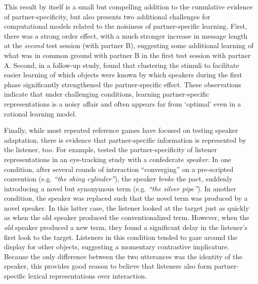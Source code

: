 \documentclass[11pt, floatsintext, jou]{apa6}
\begin{document}
This result by itself is a small but compelling addition to the cumulative evidence of partner-specificity, but also presents two additional challenges for computational models related to the noisiness of partner-specific learning. First, there was a strong order effect, with a much stronger increase in message length at the \emph{second} test session (with partner B), suggesting some additional learning of what was in common ground with partner B in the first test session with partner A. Second, in a follow-up study,  found that clustering the stimuli to facilitate easier learning of which objects were known by which speakers during the first phase significantly strengthened the partner-specific effect. These observations indicate that under challenging conditions, learning partner-specific representations is a noisy affair and often appears far from `optimal' even in a rational learning model. 


Finally, while most repeated reference games have focused on testing speaker adaptation, there is evidence that partner-specific information is represented by the listener, too. For example,  tested the partner-specificity of listener representations in an eye-tracking study with a confederate \emph{speaker}. In one condition, after several rounds of interaction ``converging'' on a pre-scripted convention (e.g. \emph{``the shiny cylinder''}), the speaker \emph{broke} the pact, suddenly introducing a novel but synonymous term (e.g. \emph{``the silver pipe''}). In another condition, the speaker was replaced such that the novel term was produced by a novel speaker. In this latter case, the listener looked at the target just as quickly as when the old speaker produced the conventionalized term. However, when the \emph{old} speaker produced a new term, they found a significant delay in the listener's first look to the target. Listeners in this condition tended to gaze around the display for other objects, suggesting a momentary contrastive implicature. Because the only difference between the two utterances was the identity of the speaker, this provides good reason to believe that listeners also form partner-specific lexical representations over interaction. %
\end{document}
